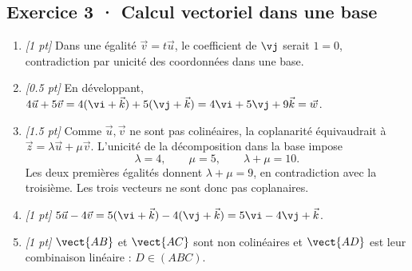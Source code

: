 \subsection*{Exercice 3 · Calcul vectoriel dans une base}\begin{enumerate}

\item \textit{[1 pt]} Dans une égalité $\vec v=t\vec u$, le coefficient de $\vj $ serait $1=0$, contradiction par unicité des coordonnées dans une base.

\item \textit{[\num{0,5} pt]} En développant, $4\vec u+5\vec v=4(\vi +\vec k)+5(\vj +\vec k)=4\vi +5\vj +9\vec k=\vec w$.

\item \textit{[\num{1,5} pt]} Comme $\vec u,\vec v$ ne sont pas colinéaires, la coplanarité équivaudrait à $\vec z=\lambda\vec u+\mu\vec v$. L'unicité de la décomposition dans la base impose
\[\lambda=4,\qquad\mu=5,\qquad\lambda+\mu=10.\]
Les deux premières égalités donnent $\lambda+\mu=9$, en contradiction avec la troisième. Les trois vecteurs ne sont donc pas coplanaires.

\item \textit{[1 pt]} $5\vec u-4\vec v=5(\vi +\vec k)-4(\vj +\vec k)=5\vi -4\vj +\vec k$.

\item \textit{[1 pt]} $\vect{AB}$ et $\vect{AC}$ sont non colinéaires et $\vect{AD}$ est leur combinaison linéaire : $D\in(ABC)$.

\end{enumerate}


